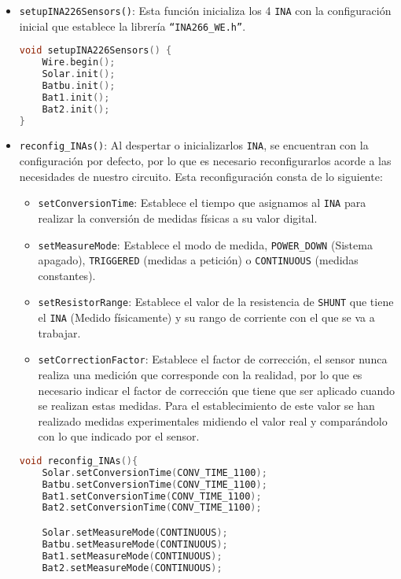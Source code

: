 \begin{itemize}
\item \texttt{setupINA226Sensors()}: Esta función inicializa los 4 \texttt{INA} con la configuración inicial que establece la librería \texttt{“INA266\_WE.h”}.

\begin{lstlisting}[captionpos=b, caption={Codigo función \texttt{setupINA226Sensors}}, language=c++]
void setupINA226Sensors() {
    Wire.begin();
    Solar.init();
    Batbu.init();
    Bat1.init();
    Bat2.init();
}
\end{lstlisting}

\item \texttt{reconfig\_INAs()}: Al despertar o inicializarlos \texttt{INA}, se encuentran con la configuración por defecto, por lo que es necesario reconfigurarlos acorde a las necesidades de nuestro circuito. Esta reconfiguración consta de lo siguiente:
\begin{itemize}
    \item \texttt{setConversionTime}: Establece el tiempo que asignamos al \texttt{INA} para realizar la conversión de medidas físicas a su valor digital.
    \item \texttt{setMeasureMode}: Establece el modo de medida, \texttt{POWER\_DOWN} (Sistema apagado), \texttt{TRIGGERED} (medidas a petición) o \texttt{CONTINUOUS} (medidas constantes).
    \item \texttt{setResistorRange}: Establece el valor de la resistencia de \texttt{SHUNT} que tiene el \texttt{INA} (Medido físicamente) y su rango de corriente con el que se va a trabajar.
    \item \texttt{setCorrectionFactor}: Establece el factor de corrección, el sensor nunca realiza una medición que corresponde con la realidad, por lo que es necesario indicar el factor de corrección que tiene que ser aplicado cuando se realizan estas medidas. Para el establecimiento de este valor se han realizado medidas experimentales midiendo el valor real y comparándolo con lo que indicado por el sensor.
\end{itemize}


\begin{lstlisting}[captionpos=b, caption={Codigo funcion reconfig\_INAs}, language=c++]
void reconfig_INAs(){
    Solar.setConversionTime(CONV_TIME_1100);
    Batbu.setConversionTime(CONV_TIME_1100);
    Bat1.setConversionTime(CONV_TIME_1100);
    Bat2.setConversionTime(CONV_TIME_1100);

    Solar.setMeasureMode(CONTINUOUS);
    Batbu.setMeasureMode(CONTINUOUS);
    Bat1.setMeasureMode(CONTINUOUS);
    Bat2.setMeasureMode(CONTINUOUS);
    

\end{lstlisting}
\end{itemize}
